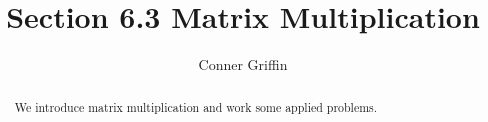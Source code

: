 \documentclass{ximera}
\title{Section 6.3 Matrix Multiplication}
\author{Conner Griffin}
\begin{document}
\begin{abstract}
    We introduce matrix multiplication and work some applied problems.
\end{abstract}
\maketitle
\end{document}

